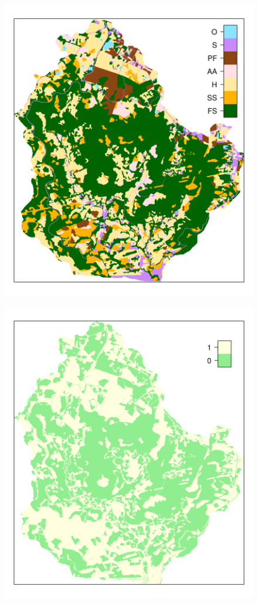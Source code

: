 \begin{figure}[!ht]
\begin{minipage}[b]{0.45\textwidth}
\subcaption{}
\label{fig:chap05-land-use-new}
\centering
\includegraphics[width = \textwidth]{fig/chap05-land-new}
\end{minipage}
\begin{minipage}[b]{0.45\textwidth}
\subcaption{}
\label{fig:chap05-land-use-diff}
\centering
\includegraphics[width = \textwidth]{fig/chap05-land-diff}

\end{minipage}
\end{figure}
